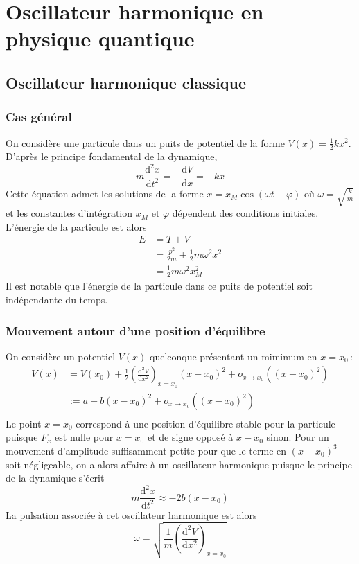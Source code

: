 \section{Oscillateur harmonique en physique quantique}

    \subsection{Oscillateur harmonique classique}

        \subsubsection{Cas général}

        On considère une particule dans un puits de potentiel de la forme $V(x) = \frac{1}{2} kx^2$. D’après le principe fondamental de la dynamique, 
        \[ m \frac{\text{d}^2 x}{\text{d}t^2} = - \frac{\text{d}V}{\text{d}x} = - kx \]   
        Cette équation admet les solutions de la forme $x = x_M \cos(\omega t - \varphi)$ où $\omega = \sqrt{\frac{k}{m}}$ et les constantes d’intégration $x_M$ et $\varphi$ dépendent des conditions initiales. L’énergie de la particule est alors 
        \begin{align*}
            E 
            &= T + V \\
            &= \frac{p^2}{2m} + \frac{1}{2} m \omega^2 x^2 \\
            &= \frac{1}{2} m \omega^2 x_M^2
        \end{align*} 
        Il est notable que l’énergie de la particule dans ce puits de potentiel soit indépendante du temps.

        \subsubsection{Mouvement autour d’une position d’équilibre}

        On considère un potentiel $V(x)$ quelconque présentant un mimimum en $x = x_0$ :
        \begin{align*}
            V(x) 
            &= V(x_0) + \frac{1}{2} \left(\frac{\text{d}^2 V}{\text{d}x^2}\right)_{x = x_0}(x - x_0)^2 + o_{x \to x_0} \left((x - x_0)^2\right) \\
            &:= a + b (x - x_0)^2 + o_{x \to x_0} \left((x - x_0)^2\right) \\
        \end{align*}
        Le point $x = x_0$ correspond à une position d’équilibre stable pour la particule puisque $F_x$ est nulle pour $x = x_0$ et de signe opposé à $x-x_0$ sinon. Pour un mouvement d’amplitude suffisamment petite pour que le terme en $(x - x_0)^3$ soit négligeable, on a alors affaire à un oscillateur harmonique puisque le principe de la dynamique s’écrit 
        \[ m \frac{\text{d}^2 x}{\text{d}t^2} \approx -2b(x-x_0) \]   
        La pulsation associée à cet oscillateur harmonique est alors 
        \[ \omega = \sqrt{\frac{1}{m} \left(\frac{\text{d}^2 V}{\text{d}x^2}\right)_{x = x_0}}  \]

